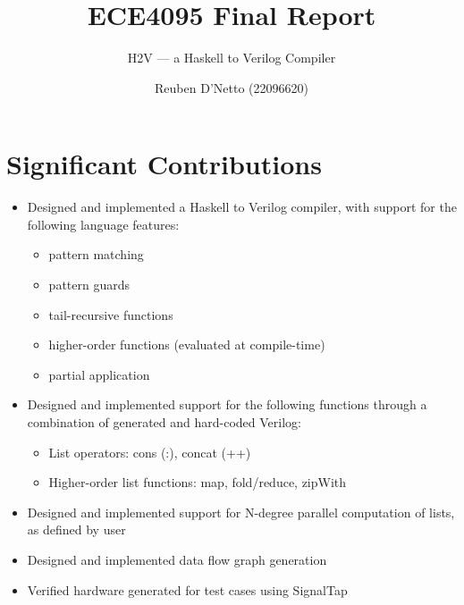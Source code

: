 \documentclass[english,onecolumn]{scrartcl}
\begin{document}
\title{ECE4095 Final Report}
\subtitle{H2V --- a Haskell to Verilog Compiler}
\author{Reuben D'Netto (22096620)}

\maketitle
\tableofcontents{}
\pagebreak{}


\section{Significant Contributions}
\begin{itemize}
    \item Designed and implemented a Haskell to Verilog compiler, with support for the following language features:
        \begin{itemize}
            \item pattern matching
            \item pattern guards
            \item tail-recursive functions
            \item higher-order functions (evaluated at compile-time)
            \item partial application
        \end{itemize}
    \item Designed and implemented support for the following functions through a combination of generated and hard-coded Verilog:
        \begin{itemize}
            \item List operators: cons (:), concat (++)
            \item Higher-order list functions: map, fold/reduce, zipWith
        \end{itemize}
    \item Designed and implemented support for N-degree parallel computation of lists, as defined by user
    \item Designed and implemented data flow graph generation
    \item Verified hardware generated for test cases using SignalTap
\end{itemize}

\newcommand\invisiblesection[1]{%
    \refstepcounter{section}%
    \addcontentsline{toc}{section}{\protect\numberline{\thesection}#1}%
    \sectionmark{#1}}
\end{document}
